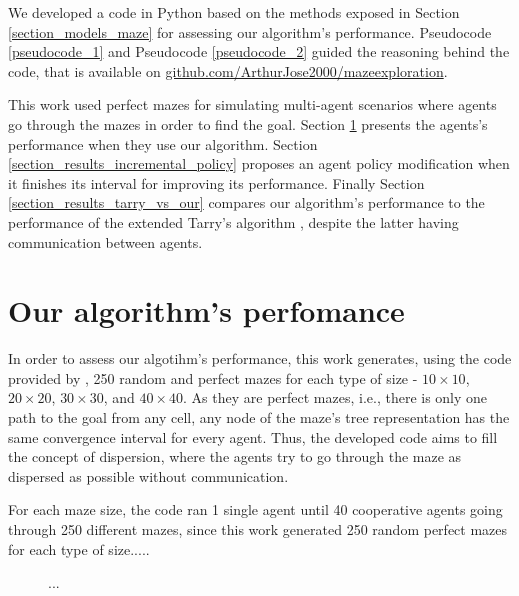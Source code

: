 \label{section_results}
We developed a code in Python based on the methods exposed in Section \ref{section_models_maze} for assessing our algorithm's performance. Pseudocode \ref{pseudocode_1} and Pseudocode \ref{pseudocode_2} guided the reasoning behind the code, that is available on \href{https://github.com/ArthurJose2000/mazeexploration}{github.com/ArthurJose2000/mazeexploration}.

This work used perfect mazes for simulating multi-agent scenarios where agents go through the mazes in order to find the goal. Section \ref{section_results_our_performance} presents the agents's performance when they use our algorithm. Section \ref{section_results_incremental_policy} proposes an agent policy modification when it finishes its interval for improving its performance. Finally Section \ref{section_results_tarry_vs_our} compares our algorithm's performance to the performance of the extended Tarry's algorithm \cite{KivelevitchCohen2010}, despite the latter having communication between agents.

\section{Our algorithm's perfomance}
\label{section_results_our_performance}

In order to assess our algotihm's performance, this work generates, using the code provided by , 250 random and perfect mazes for each type of size - $10 \times 10$, $20 \times 20$, $30 \times 30$, and $40 \times 40$. As they are perfect mazes, i.e., there is only one path to the goal from any cell, any node of the maze's tree representation has the same convergence interval for every agent. Thus, the developed code aims to fill the concept of dispersion, where the agents try to go through the maze as dispersed as possible without communication.

For each maze size, the code ran 1 single agent until 40 cooperative agents going through 250 different mazes, since this work generated 250 random perfect mazes for each type of size.....

\begin{figure}
    \centering
    \qquad
    \qquad
    \newline
    \qquad
    \caption{...}
    \label{our_algorithm_steps}
\end{figure}

